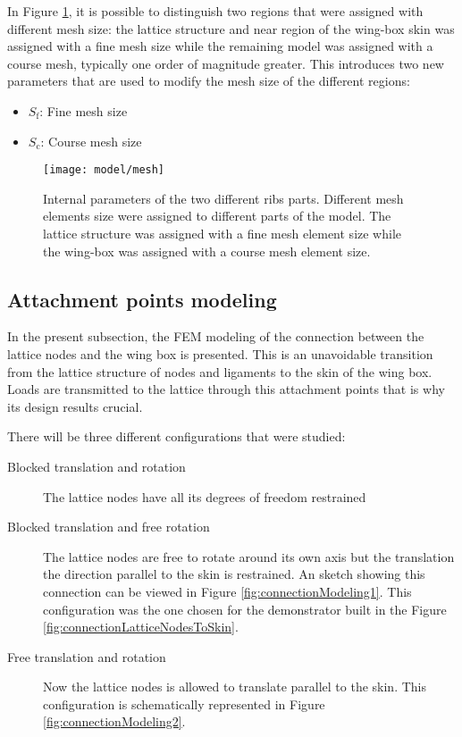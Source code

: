 In Figure \ref{fig:mesh}, it is possible to distinguish two regions that were assigned with different mesh size: the lattice structure and near region of the wing-box skin was assigned with a fine mesh size while the remaining model was assigned with a course mesh, typically one order of magnitude greater. This introduces two new parameters that are used to modify the mesh size of the different regions:

\begin{itemize}
  \item $S_{\mathrm{f}}$: Fine mesh size
  \item $S_{\mathrm{c}}$: Course mesh size
\end{itemize}

\begin{figure}[!htpb]
  \centering
  \texttt{[image: model/mesh]}
  \caption[Internal parameters of the two different ribs parts]{Internal parameters of the two different ribs parts. Different mesh elements size were assigned to different parts of the model. The lattice structure was assigned with a fine mesh element size while the wing-box was assigned with a course mesh element size.}\label{fig:mesh}
\end{figure}

\clearpage
\subsection{Attachment points modeling} \label{subsec:connections_computationalModel}

%
%
%
%
In the present subsection, the FEM modeling of the connection between the lattice nodes and the wing box is presented. This is an unavoidable transition from the lattice structure of nodes and ligaments to the skin of the wing box. Loads are transmitted to the lattice through this attachment points that is why its design results crucial.

There will be three different configurations that were studied:

\begin{description}
  \item[Blocked translation and rotation] The lattice nodes have all its degrees of freedom restrained
  \item[Blocked translation and free rotation] The lattice nodes are free to rotate around its own axis but the translation the direction parallel to the skin is restrained. An sketch showing this connection can be viewed in Figure \ref{fig:connectionModeling1}. This configuration was the one chosen for the demonstrator built in the Figure \ref{fig:connectionLatticeNodesToSkin}.
  \item[Free translation and rotation] Now the lattice nodes is allowed to translate parallel to the skin. This configuration is schematically represented in Figure \ref{fig:connectionModeling2}.
\end{description}

